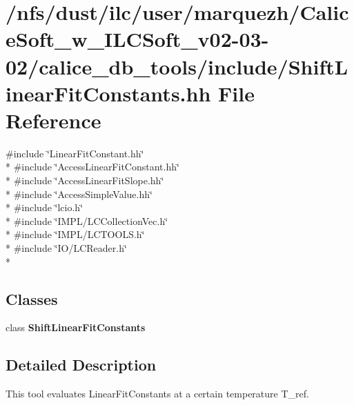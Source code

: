 \section{/nfs/dust/ilc/user/marquezh/\-Calice\-Soft\-\_\-w\-\_\-\-I\-L\-C\-Soft\-\_\-v02-\/03-\/02/calice\-\_\-db\-\_\-tools/include/\-Shift\-Linear\-Fit\-Constants.hh File Reference}
\label{ShiftLinearFitConstants_8hh}
{\ttfamily \#include \char`\"{}Linear\-Fit\-Constant.\-hh\char`\"{}}\\*
{\ttfamily \#include \char`\"{}Access\-Linear\-Fit\-Constant.\-hh\char`\"{}}\\*
{\ttfamily \#include \char`\"{}Access\-Linear\-Fit\-Slope.\-hh\char`\"{}}\\*
{\ttfamily \#include \char`\"{}Access\-Simple\-Value.\-hh\char`\"{}}\\*
{\ttfamily \#include \char`\"{}lcio.\-h\char`\"{}}\\*
{\ttfamily \#include \char`\"{}I\-M\-P\-L/\-L\-C\-Collection\-Vec.\-h\char`\"{}}\\*
{\ttfamily \#include \char`\"{}I\-M\-P\-L/\-L\-C\-T\-O\-O\-L\-S.\-h\char`\"{}}\\*
{\ttfamily \#include \char`\"{}I\-O/\-L\-C\-Reader.\-h\char`\"{}}\\*
\subsection*{Classes}
\begin{DoxyCompactItemize}
\item 
class {\bf Shift\-Linear\-Fit\-Constants}
\end{DoxyCompactItemize}


\subsection{Detailed Description}
This tool evaluates Linear\-Fit\-Constants at a certain temperature T\-\_\-ref.

